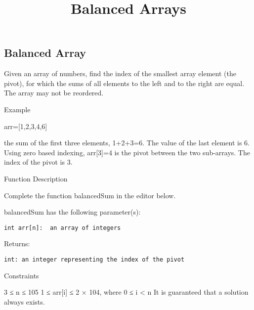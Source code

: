 \documentclass[
]{article}
\title{Balanced Arrays}
\author{}
\date{\vspace{-2.5em}}
\begin{document}
\maketitle

\hypertarget{balanced-array}{%
\subsection{Balanced Array}\label{balanced-array}}

Given an array of numbers, find the index of the smallest array element
(the pivot), for which the sums of all elements to the left and to the
right are equal. The array may not be reordered.

Example

arr={[}1,2,3,4,6{]}

the sum of the first three elements, 1+2+3=6. The value of the last
element is 6. Using zero based indexing, arr{[}3{]}=4 is the pivot
between the two sub-arrays. The index of the pivot is 3.

Function Description

Complete the function balancedSum in the editor below.

balancedSum has the following parameter(s):

\begin{verbatim}
int arr[n]:  an array of integers
\end{verbatim}

Returns:

\begin{verbatim}
int: an integer representing the index of the pivot
\end{verbatim}

Constraints

3 ≤ n ≤ 105 1 ≤ arr{[}i{]} ≤ 2 × 104, where 0 ≤ i \textless{} n It is
guaranteed that a solution always exists.
\end{document}
